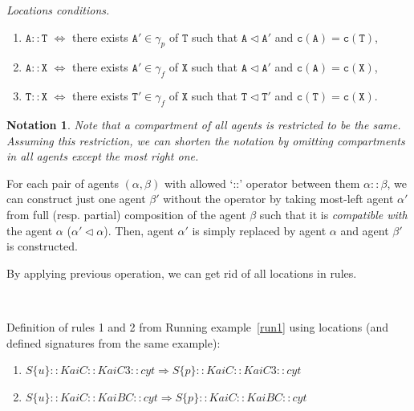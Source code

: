\documentclass{elsarticle}
\newtheorem{notation}{Notation}
\begin{document}
\begin{definition}\label{locations:conditions}
\emph{Locations conditions.}

\begin{enumerate}
 \item $\mathtt{A}::\mathtt{T}$ $\Leftrightarrow$ there exists $\mathtt{A}' \in \gamma_p$ of $\mathtt{T}$ such that $\mathtt{A} \lhd \mathtt{A}'$ and $\mathtt{c}(\mathtt{A}) = \mathtt{c}(\mathtt{T})$,

\item $\mathtt{A}::\mathtt{X}$ $\Leftrightarrow$ there exists $\mathtt{A}' \in \gamma_f$ of $\mathtt{X}$ such that $\mathtt{A} \lhd \mathtt{A}'$ and $\mathtt{c}(\mathtt{A}) = \mathtt{c}(\mathtt{X})$,

\item $\mathtt{T}::\mathtt{X}$ $\Leftrightarrow$ there exists $\mathtt{T}' \in \gamma_f$ of $\mathtt{X}$ such that $\mathtt{T} \lhd \mathtt{T}'$ and $\mathtt{c}(\mathtt{T}) = \mathtt{c}(\mathtt{X})$.
\end{enumerate}
\end{definition}

\begin{notation}
Note that a compartment of all agents is restricted to be the same. Assuming this restriction, we can shorten the notation by omitting compartments in all agents except the most right one.
\end{notation}

For each pair of agents $(\alpha, \beta)$ with allowed `::' operator between them $\alpha :: \beta$, we can construct just one agent $\beta'$ without the operator by taking most-left agent $\alpha'$ from full (resp. partial) composition of the agent $\beta$ such that it is \emph{compatible with} the agent $\alpha$ ($\alpha' \lhd \alpha$). Then, agent $\alpha'$ is simply replaced by agent $\alpha$ and agent $\beta'$ is constructed.

By applying previous operation, we can get rid of all locations in rules.

\begin{running_example}\label{run4}
$ $

\noindent Definition of rules 1 and 2 from Running example~\ref{run1} using locations (and defined signatures from the same example):
\begin{enumerate}
\item $S\{u\}::KaiC::KaiC3::cyt \Rightarrow S\{p\}::KaiC::KaiC3::cyt$
\item $S\{u\}::KaiC::KaiBC::cyt \Rightarrow S\{p\}::KaiC::KaiBC::cyt$
\end{enumerate}
\end{running_example}
\end{document}
